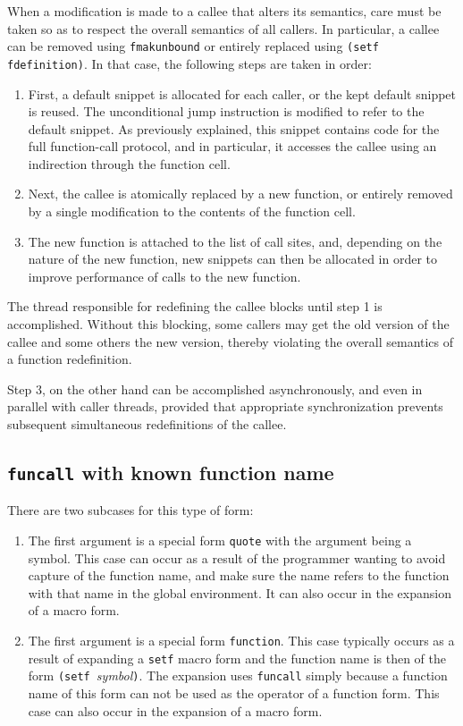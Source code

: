 When a modification is made to a callee that alters its semantics,
care must be taken so as to respect the overall semantics of all
callers.  In particular, a callee can be removed using
\texttt{fmakunbound} or entirely replaced using \texttt{(setf
  fdefinition)}.  In that case, the following steps are taken in
order:

\begin{enumerate}
\item First, a default snippet is allocated for each caller, or the
  kept default snippet is reused.  The unconditional jump instruction
  is modified to refer to the default snippet.  As previously
  explained, this snippet contains code for the full function-call
  protocol, and in particular, it accesses the callee using an
  indirection through the function cell.
\item Next, the callee is atomically replaced by a new function, or
  entirely removed by a single modification to the contents of the
  function cell.
\item The new function is attached to the list of call sites, and,
  depending on the nature of the new function, new snippets can then
  be allocated in order to improve performance of calls to the new
  function.
\end{enumerate}

The thread responsible for redefining the callee blocks until step 1
is accomplished.  Without this blocking, some callers may get the old
version of the callee and some others the new version, thereby
violating the overall semantics of a function redefinition.

Step 3, on the other hand can be accomplished asynchronously, and even
in parallel with caller threads, provided that appropriate
synchronization prevents subsequent simultaneous redefinitions of the
callee.

\subsection{\texttt{funcall} with known function name}

There are two subcases for this type of form:

\begin{enumerate}
\item The first argument is a special form \texttt{quote} with the
  argument being a symbol.  This case can occur as a result of the
  programmer wanting to avoid capture of the function name, and make
  sure the name refers to the function with that name in the global
  environment.  It can also occur in the expansion of a macro form.
\item The first argument is a special form \texttt{function}.  This
  case typically occurs as a result of expanding a \texttt{setf} macro
  form and the function name is then of the form \texttt{(setf
  }\textit{symbol}\texttt{)}.  The expansion uses \texttt{funcall}
  simply because a function name of this form can not be used as the
  operator of a function form.  This case can also occur in the
  expansion of a macro form.
\end{enumerate}

